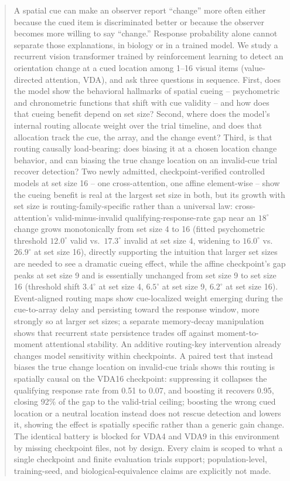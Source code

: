 \documentclass[11pt,a4paper]{article}
\begin{document}
\begin{abstract}
A spatial cue can make an observer report ``change'' more often either because the cued item is discriminated better or because the observer becomes more willing to say ``change.'' Response probability alone cannot separate those explanations, in biology or in a trained model. We study a recurrent vision transformer trained by reinforcement learning to detect an orientation change at a cued location among 1--16 visual items (value-directed attention, VDA), and ask three questions in sequence. First, does the model show the behavioral hallmarks of spatial cueing -- psychometric and chronometric functions that shift with cue validity -- and how does that cueing benefit depend on set size? Second, where does the model's internal routing allocate weight over the trial timeline, and does that allocation track the cue, the array, and the change event? Third, is that routing causally load-bearing: does biasing it at a chosen location change behavior, and can biasing the true change location on an invalid-cue trial recover detection? Two newly admitted, checkpoint-verified controlled models at set size 16 -- one cross-attention, one affine element-wise -- show the cueing benefit is real at the largest set size in both, but its growth with set size is routing-family-specific rather than a universal law: cross-attention's valid-minus-invalid qualifying-response-rate gap near an $18^\circ$ change grows monotonically from set size 4 to 16 (fitted psychometric threshold $12.0^\circ$ valid vs.\ $17.3^\circ$ invalid at set size 4, widening to $16.0^\circ$ vs.\ $26.9^\circ$ at set size 16), directly supporting the intuition that larger set sizes are needed to see a dramatic cueing effect, while the affine checkpoint's gap peaks at set size 9 and is essentially unchanged from set size 9 to set size 16 (threshold shift $3.4^\circ$ at set size 4, $6.5^\circ$ at set size 9, $6.2^\circ$ at set size 16). Event-aligned routing maps show cue-localized weight emerging during the cue-to-array delay and persisting toward the response window, more strongly so at larger set sizes; a separate memory-decay manipulation shows that recurrent state persistence trades off against moment-to-moment attentional stability. An additive routing-key intervention already changes model sensitivity within checkpoints. A paired test that instead biases the true change location on invalid-cue trials shows this routing is spatially causal on the VDA16 checkpoint: suppressing it collapses the qualifying response rate from 0.51 to 0.07, and boosting it recovers 0.95, closing 92\% of the gap to the valid-trial ceiling; boosting the wrong cued location or a neutral location instead does not rescue detection and lowers it, showing the effect is spatially specific rather than a generic gain change. The identical battery is blocked for VDA4 and VDA9 in this environment by missing checkpoint files, not by design. Every claim is scoped to what a single checkpoint and finite evaluation trials support; population-level, training-seed, and biological-equivalence claims are explicitly not made.
\end{abstract}
\end{document}
